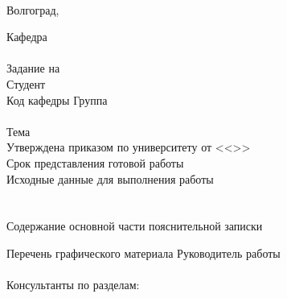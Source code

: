 {{\hfill
{}\\
\vspace{\fill}
\begin{center}
Волгоград,~\the\year
\end{center}
\newpage
{
\clearpage
\thispagestyle{empty}
\begin{center}
\VSTUTitleHeading
\end{center}
Кафедра~\uline{\VSTUDepartment\hfill}\\
\vfill
\hfill\VSTUTitleHeadApproval
\vspace{\fill}
\\Задание на \\
Студент \\
Код кафедры \uline{\makebox[4cm]{\VSTUDepartmentCode}} \hfill Группа \uline{\makebox[4cm]{\VSTUStudentGroup}}\\
\vspace{1mm}\\
Тема \VSTUTitleUL\\
Утверждена приказом по университету от <<\uline{\makebox[0.5cm]{\VSTUOrderDate}}>> \uline{\makebox[1.8cm]{\VSTUOrderMonth}} \uline{\makebox[1.2cm]{\VSTUOrderYear}} \textnumero\uline{\makebox[2cm]{\VSTUOrderNumber}}\\
Срок представления готовой работы \\
Исходные данные для выполнения работы\\
\VSTUInitialDataUL\\
\vspace{4mm}\\
Содержание основной части пояснительной записки
{\small
\VSTUPZContents
}
\thispagestyle{empty}
\addtocounter{page}{-1}
\noindent Перечень графического материала
{\small
\VSTUPZGraphics
}
\vspace{\fill}
\thispagestyle{empty}
\noindent Руководитель работы 
\hfill
{}\\\\
Консультанты по разделам:\\
\hfill
{}
}}}
